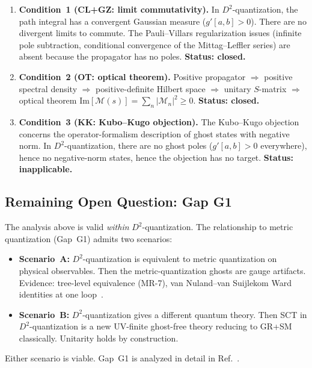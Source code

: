 \documentclass[11pt,a4paper]{article}
\begin{document}
\begin{enumerate}
  \item \textbf{Condition~1 (CL+GZ: limit commutativity).}
    In $D^2$-quantization, the path integral has a convergent Gaussian
    measure ($g'[a,b] > 0$).  There are no divergent limits to commute.
    The Pauli--Villars regularization issues (infinite pole subtraction,
    conditional convergence of the Mittag--Leffler series) are absent
    because the propagator has no poles.
    \textbf{Status: closed.}

  \item \textbf{Condition~2 (OT: optical theorem).}
    Positive propagator $\Rightarrow$ positive spectral density
    $\Rightarrow$ positive-definite Hilbert space
    $\Rightarrow$ unitary $S$-matrix
    $\Rightarrow$ optical theorem $\mathrm{Im}[\mathcal{M}(s)]
    = \sum_n |\mathcal{M}_n|^2 \geq 0$.
    \textbf{Status: closed.}

  \item \textbf{Condition~3 (KK: Kubo--Kugo objection).}
    The Kubo--Kugo objection~\cite{KuboKugo2023} concerns the
    operator-formalism description of ghost states with negative norm.
    In $D^2$-quantization, there are no ghost poles ($g'[a,b] > 0$
    everywhere), hence no negative-norm states, hence the objection has
    no target.
    \textbf{Status: inapplicable.}
\end{enumerate}

\subsection{Remaining Open Question: Gap G1}

The analysis above is valid \emph{within} $D^2$-quantization.  The
relationship to metric quantization (Gap~G1) admits two scenarios:
\begin{itemize}[nosep]
  \item \textbf{Scenario~A:} $D^2$-quantization is equivalent to metric
    quantization on physical observables.  Then the metric-quantization
    ghosts are gauge artifacts.  Evidence: tree-level equivalence
    (MR-7), van Nuland--van Suijlekom Ward identities at one
    loop~\cite{vNvS2021}.
  \item \textbf{Scenario~B:} $D^2$-quantization gives a different quantum
    theory.  Then SCT in $D^2$-quantization is a new UV-finite ghost-free
    theory reducing to GR+SM classically.  Unitarity holds by construction.
\end{itemize}
Either scenario is viable.  Gap~G1 is analyzed in detail in
Ref.~\cite{Alfyorov:2026ct}.
\end{document}
